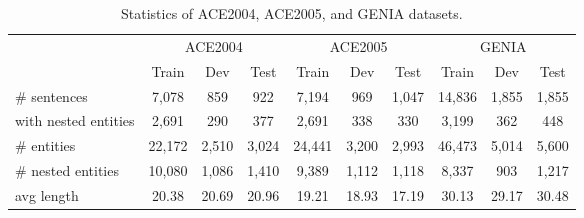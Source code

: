 \begin{table*}[t]
  \centering
  \begin{tabular}{@{} l  ccc  ccc  ccc @{}}
    \toprule
    & \multicolumn{3}{c}{ACE2004} & \multicolumn{3}{c}{ACE2005} & \multicolumn{3}{c}{ GENIA} \\ 
    &Train & Dev & Test &Train & Dev & Test &Train & Dev & Test \\ 
    \hline			
    \# sentences & 7,078 & 859 & 922 & 7,194 & 969 &1,047 & 14,836 & 1,855 & 1,855 \\ 			
    {with nested entities } & 2,691 & 290 & 377 & 2,691 & 338 & 330 & 3,199 & 362 & 448 \\			
    \# entities & 22,172 &2,510 & 3,024 & 24,441 & 3,200 & 2,993 & 46,473 & 5,014 & 5,600 \\			
    {\# nested entities} & 10,080 &1,086 & 1,410 &9,389 & 1,112& 1,118 & 8,337 & 903 & 1,217 \\			
    avg length & 20.38 & 20.69 & 20.96 & 19.21 & 18.93 &17.19 &30.13 & 29.17 &30.48 \\
    \bottomrule
  \end{tabular}
  \caption{Statistics of ACE2004, ACE2005, and GENIA datasets.}
  \label{dataset}
\end{table*} 
